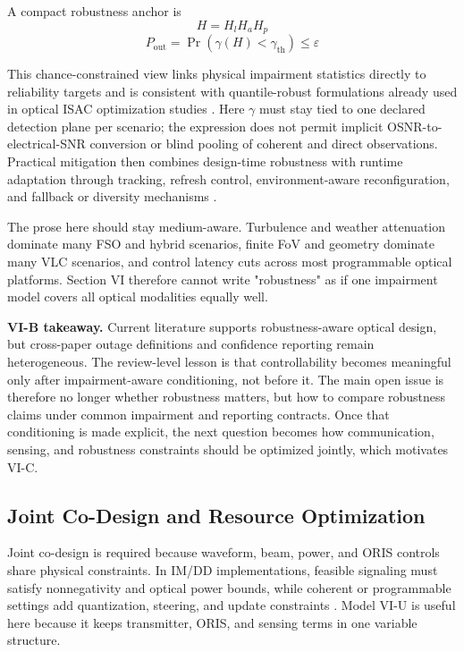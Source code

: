 \documentclass[lettersize,journal]{IEEEtran}
\begin{document}
A compact robustness anchor is
\begin{equation}
H=H_l H_a H_p
\end{equation}
\begin{equation}
P_{\text{out}}=\Pr\!\left(\gamma(H)<\gamma_{\text{th}}\right)\le \varepsilon
\end{equation}

This chance-constrained view links physical impairment statistics directly to reliability targets and is consistent with quantile-robust formulations already used in optical ISAC optimization studies \cite{O_ISAC_023,O_ISAC_061,O_ISAC_091}. Here $\gamma$ must stay tied to one declared detection plane per scenario; the expression does not permit implicit OSNR-to-electrical-SNR conversion or blind pooling of coherent and direct observations. Practical mitigation then combines design-time robustness with runtime adaptation through tracking, refresh control, environment-aware reconfiguration, and fallback or diversity mechanisms \cite{O_ISAC_098,O_ISAC_112,O_ISAC_127,O_ISAC_199}.

The prose here should stay medium-aware. Turbulence and weather attenuation dominate many FSO and hybrid scenarios, finite FoV and geometry dominate many VLC scenarios, and control latency cuts across most programmable optical platforms. Section VI therefore cannot write "robustness" as if one impairment model covers all optical modalities equally well.

\textbf{VI-B takeaway.} Current literature supports robustness-aware optical design, but cross-paper outage definitions and confidence reporting remain heterogeneous. The review-level lesson is that controllability becomes meaningful only after impairment-aware conditioning, not before it. The main open issue is therefore no longer whether robustness matters, but how to compare robustness claims under common impairment and reporting contracts. Once that conditioning is made explicit, the next question becomes how communication, sensing, and robustness constraints should be optimized jointly, which motivates VI-C.

\subsection{Joint Co-Design and Resource Optimization}

Joint co-design is required because waveform, beam, power, and ORIS controls share physical constraints. In IM/DD implementations, feasible signaling must satisfy nonnegativity and optical power bounds, while coherent or programmable settings add quantization, steering, and update constraints \cite{O_ISAC_009,O_ISAC_023,O_ISAC_054,O_ISAC_061,O_ISAC_091,O_ISAC_127}. Model VI-U is useful here because it keeps transmitter, ORIS, and sensing terms in one variable structure.
\end{document}
